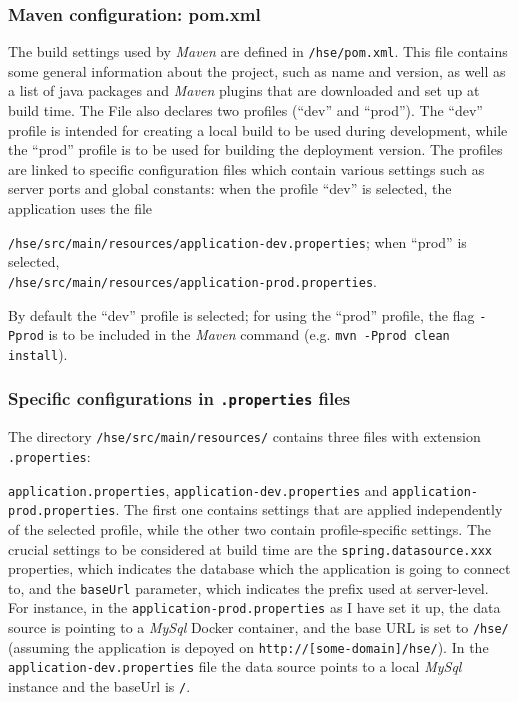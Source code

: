 \documentclass[a4paper]{usiinfbachelorproject}
\begin{document}
\begin{appendices}
        \subsubsection{Maven configuration: pom.xml}

        The build settings used by \emph{Maven} are defined in \texttt{/hse/pom.xml}. This file contains some general information
        about the project, such as name and version, as well as a list of java packages and \emph{Maven} plugins that are 
        downloaded and set up at build time. The File also declares two profiles (``dev'' and ``prod''). The ``dev'' profile 
        is intended for creating a local build to be used during development, while the ``prod'' profile is to be used for building the deployment version.
        The profiles are linked to specific configuration files which contain various settings such as server ports and global
        constants: when the profile ``dev'' is selected, the application uses the file 

\texttt{/hse/src/main/resources/application-dev.properties};
        when ``prod'' is selected, \\ \texttt{/hse/src/main/resources/application-prod.properties}. 

        By default the ``dev'' profile is selected;
        for using the ``prod'' profile, the flag \texttt{-Pprod} is to be included in the \emph{Maven} command 
        (e.g. \texttt{mvn -Pprod clean install}).

        \subsubsection{Specific configurations in \texttt{.properties} files}

        The directory \texttt{/hse/src/main/resources/} contains three files with extension \texttt{.properties}:

        \texttt{application.properties}, \texttt{application-dev.properties} and \texttt{application-prod.properties}.
        The first one contains settings that are applied independently of the selected profile, while the other
        two contain profile-specific settings. The crucial settings to be considered at build time are the 
        \texttt{spring.datasource.xxx} properties, which indicates the database which the application is going to connect to, and 
        the \texttt{baseUrl} parameter, which indicates the prefix used at server-level.
        For instance, in the \texttt{application-prod.properties} as I have set it up, the data source is pointing to a \emph{MySql} Docker container,
        and the base URL is set to \texttt{/hse/} (assuming the application is depoyed on \texttt{http://[some-domain]/hse/}). 
        In the \texttt{application-dev.properties} file the data source points to a local \emph{MySql} instance and the baseUrl is \texttt{/}.


\end{appendices}
\end{document}
